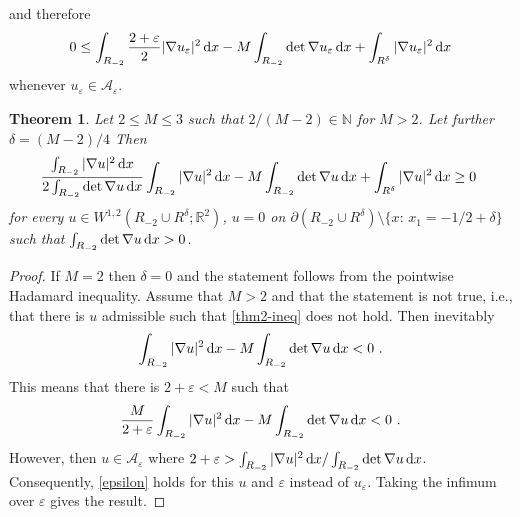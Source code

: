 \documentclass[12pt]{amsart}
\newcommand{\md}{{\rm d}}
\newcommand{\R}{\mathbb{R}}
\newcommand{\1}{{\bf 1}}
\newtheorem{theorem}[definition]{Theorem}
\begin{document}
and therefore 
\begin{align}\label{epsilon}
   0\le  \int_{R_{-2}}\frac{2+\varepsilon}{2}|\nabla u_\varepsilon|^2 \,\md x -M\int_{R_{-2}}\det\nabla u_\varepsilon\,\md x+\int_{R^\delta}|\nabla u_\varepsilon|^2 \,\md x 
\end{align} 
whenever $u_\varepsilon\in\mathcal{A}_\varepsilon.$

\begin{theorem} \label{Th:delta}
    Let $2\le M\le 3$ such that $2/(M-2)\in\mathbb{N}$ for $M>2$. Let further $\delta=(M-2)/4$  Then 
    \begin{align}\label{thm2-ineq}
   \frac{\int_{R_{-2}}|\nabla u|^2 \,\md x}{2\int_{R_{-2}}\det\nabla u\,\md x} \int_{R_{-2}}|\nabla u|^2 \,\md x-M\int_{R_{-2}}\det\nabla u\,\md x+ \int_{R^\delta}|\nabla u|^2 \,\md x\ge 0\ 
\end{align}
for every $u\in W^{1,2}(R_{-2}\cup R^\delta;\R^2)$, $u=0$ on $\partial ( R_{-2}\cup R^\delta)\setminus \{x:\, x_1=-1/2+\delta\}$ such that $\int_{R_{-2}}\det\nabla u\,\md x>0$. %
\end{theorem}

\begin{proof} If $M=2$ then $\delta=0$ and the statement follows from the pointwise Hadamard inequality.
    Assume that $M>2$ and that the statement is not true, i.e., that there is $u$ admissible such that  \eqref{thm2-ineq} does not hold. 
    Then inevitably 
\begin{align}
   \int_{R_{-2}}|\nabla u|^2 \,\md x -M\int_{R_{-2}}\det\nabla u\,\md x<0\ .
   \end{align}
   This means that there is $2+\varepsilon<M$ such that 
\begin{align}
   \frac{M}{2+\varepsilon}\int_{R_{-2}}|\nabla u|^2 \,\md x -M\int_{R_{-2}}\det\nabla u\,\md x<0\ .
   \end{align}   
 However, then $u\in\mathcal{A}_\varepsilon$ where $2+\varepsilon > \int_{R_{-2}}|\nabla u|^2 \,\md x /\int_{R_{-2}}\det\nabla u\,\md x$. Consequently, \eqref{epsilon} holds for this $u$ and $\varepsilon$ instead of $u_\varepsilon$. 
 Taking the infimum over $\varepsilon$ gives the result.
    
\end{proof}
\end{document}
